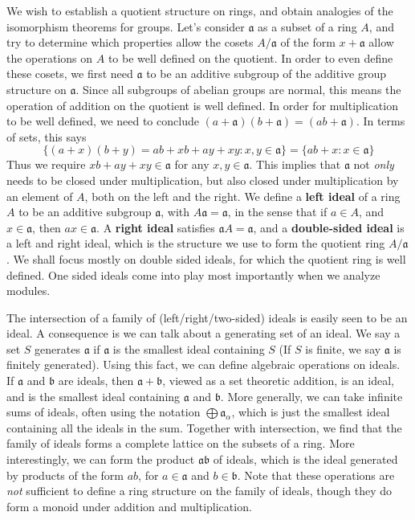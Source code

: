 We wish to establish a quotient structure on rings, and obtain analogies of the isomorphism theorems for groups. Let's consider $\mathfrak{a}$ as a subset of a ring $A$, and try to determine which properties allow the cosets $A/\mathfrak{a}$ of the form $x + \mathfrak{a}$ allow the operations on $A$ to be well defined on the quotient. In order to even define these cosets, we first need $\mathfrak{a}$ to be an additive subgroup of the additive group structure on $\mathfrak{a}$. Since all subgroups of abelian groups are normal, this means the operation of addition on the quotient is well defined. In order for multiplication to be well defined, we need to conclude $(a + \mathfrak{a})(b + \mathfrak{a}) = (ab + \mathfrak{a})$. In terms of sets, this says
%
\[ \{ (a + x)(b + y) = ab + xb + ay + xy : x,y \in \mathfrak{a} \} = \{ ab + x : x \in \mathfrak{a} \} \]
%
Thus we require $xb + ay + xy \in \mathfrak{a}$ for any $x,y \in \mathfrak{a}$. This implies that $\mathfrak{a}$ not {\it only} needs to be closed under multiplication, but also closed under multiplication by an element of $A$, both on the left and the right. We define a {\bf left ideal} of a ring $A$ to be an additive subgroup $\mathfrak{a}$, with $A\mathfrak{a} = \mathfrak{a}$, in the sense that if $a \in A$, and $x \in \mathfrak{a}$, then $ax \in \mathfrak{a}$. A {\bf right ideal} satisfies $\mathfrak{a}A = \mathfrak{a}$, and a {\bf double-sided ideal} is a left and right ideal, which is the structure we use to form the quotient ring $A/\mathfrak{a}$. We shall focus mostly on double sided ideals, for which the quotient ring is well defined. One sided ideals come into play most importantly when we analyze modules. 

The intersection of a family of (left/right/two-sided) ideals is easily seen to be an ideal. A consequence is we can talk about a generating set of an ideal. We say a set $S$ generates $\mathfrak{a}$ if $\mathfrak{a}$ is the smallest ideal containing $S$ (If $S$ is finite, we say $\mathfrak{a}$ is finitely generated). Using this fact, we can define algebraic operations on ideals. If $\mathfrak{a}$ and $\mathfrak{b}$ are ideals, then $\mathfrak{a} + \mathfrak{b}$, viewed as a set theoretic addition, is an ideal, and is the smallest ideal containing $\mathfrak{a}$ and $\mathfrak{b}$. More generally, we can take infinite sums of ideals, often using the notation $\bigoplus \mathfrak{a}_\alpha$, which is just the smallest ideal containing all the ideals in the sum. Together with intersection, we find that the family of ideals forms a complete lattice on the subsets of a ring. More interestingly, we can form the product $\mathfrak{a} \mathfrak{b}$ of ideals, which is the ideal generated by products of the form $ab$, for $a \in \mathfrak{a}$ and $b \in \mathfrak{b}$. Note that these operations are {\it not} sufficient to define a ring structure on the family of ideals, though they do form a monoid under addition and multiplication.

